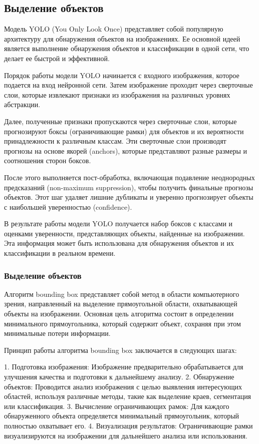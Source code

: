 

\subsection{Выделение объектов}

\cite{kirillov2023segment}



Модель YOLO (You Only Look Once) представляет собой популярную архитектуру для обнаружения объектов на изображениях. Ее основной идеей является выполнение обнаружения объектов и классификации в одной сети, что делает ее быстрой и эффективной.

Порядок работы модели YOLO начинается с входного изображения, которое подается на вход нейронной сети. Затем изображение проходит через сверточные слои, которые извлекают признаки из изображения на различных уровнях абстракции.

Далее, полученные признаки пропускаются через сверточные слои, которые прогнозируют боксы (ограничивающие рамки) для объектов и их вероятности принадлежности к различным классам. Эти сверточные слои производят прогнозы на основе якорей (anchors), которые представляют разные размеры и соотношения сторон боксов.

После этого выполняется пост-обработка, включающая подавление неоднородных предсказаний (non-maximum suppression), чтобы получить финальные прогнозы объектов. Этот шаг удаляет лишние дубликаты и уверенно прогнозирует объекты с наибольшей уверенностью (confidence).

В результате работы модели YOLO получается набор боксов с классами и оценками уверенности, представляющих объекты, найденные на изображении. Эта информация может быть использована для обнаружения объектов и их классификации в реальном времени.

\subsubsection{Выделение объектов}


Алгоритм bounding box представляет собой метод в области компьютерного зрения, направленный на выделение прямоугольной области, охватывающей объекты на изображении. Основная цель алгоритма состоит в определении минимального прямоугольника, который содержит объект, сохраняя при этом минимальные потери информации.

Принцип работы алгоритма bounding box заключается в следующих шагах:

1. Подготовка изображения: Изображение предварительно обрабатывается для улучшения качества и подготовки к дальнейшему анализу.
2. Обнаружение объектов: Проводится анализ изображения с целью выявления интересующих областей, используя различные методы, такие как выделение краев, сегментация или классификация.
3. Вычисление ограничивающих рамок: Для каждого обнаруженного объекта определяется минимальный прямоугольник, который полностью охватывает его.
4. Визуализация результатов: Ограничивающие рамки визуализируются на изображении для дальнейшего анализа или использования.

